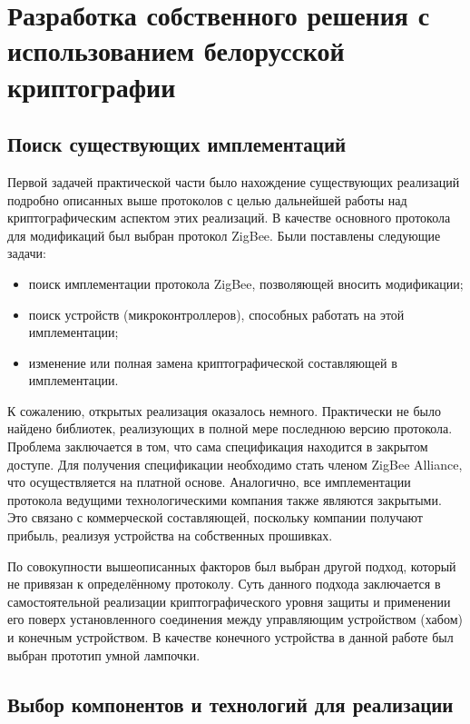 \chapter{Разработка собственного решения с использованием белорусской криптографии}

	\section{Поиск существующих имплементаций}
	
	Первой задачей практической части было нахождение существующих реализаций подробно описанных
	выше протоколов с целью дальнейшей работы над криптографическим аспектом этих реализаций.
	В качестве основного протокола для модификаций был выбран протокол ZigBee. Были поставлены
	следующие задачи:
	
	\begin{itemize}
		\item поиск имплементации протокола ZigBee, позволяющей вносить модификации; 
		\item поиск устройств (микроконтроллеров), способных работать на этой имплементации;
		\item изменение или полная замена криптографической составляющей в имплементации.
	\end{itemize}

	К сожалению, открытых реализация оказалось немного. Практически не было найдено библиотек,
	реализующих в полной мере последнюю версию протокола. Проблема заключается в том, что сама
	спецификация находится в закрытом доступе. Для получения спецификации необходимо стать
	членом ZigBee Alliance, что осуществляется на платной основе. Аналогично, все имплементации
	протокола ведущими технологическими компания также являются закрытыми. Это связано с
	коммерческой составляющей, поскольку компании получают прибыль, реализуя устройства
	на собственных прошивках.
	
	По совокупности вышеописанных факторов был выбран другой подход, который не привязан
	к определённому протоколу. Суть данного подхода заключается в самостоятельной реализации
	криптографического уровня защиты и применении его поверх установленного соединения между
	управляющим устройством (хабом) и конечным устройством. В качестве конечного устройства
	в данной работе был выбран прототип умной лампочки.
	
	
	\section{Выбор компонентов и технологий для реализации}
	
